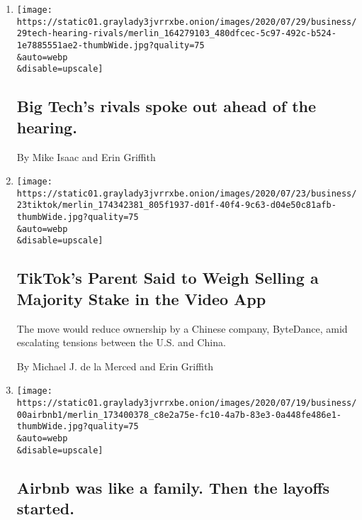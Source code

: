 \begin{enumerate}
\def\labelenumi{\arabic{enumi}.}
\item
  \href{/live/2020/07/29/technology/tech-ceos-hearing-testimony/big-techs-rivals-spoke-out-ahead-of-the-hearing}{}

  \texttt{[image: https://static01.graylady3jvrrxbe.onion/images/2020/07/29/business/29tech-hearing-rivals/merlin\_164279103\_480dfcec-5c97-492c-b524-1e7885551ae2-thumbWide.jpg?quality=75\\\&auto=webp\\\&disable=upscale]}

  \hypertarget{big-techs-rivals-spoke-out-ahead-of-the-hearing}{%
  \subsection{Big Tech's rivals spoke out ahead of the
  hearing.}\label{big-techs-rivals-spoke-out-ahead-of-the-hearing}}

  By Mike Isaac and Erin Griffith
\item
  \href{/2020/07/23/business/dealbook/tiktok-bytedance-investors-trump.html}{}

  \texttt{[image: https://static01.graylady3jvrrxbe.onion/images/2020/07/23/business/23tiktok/merlin\_174342381\_805f1937-d01f-40f4-9c63-d04e50c81afb-thumbWide.jpg?quality=75\\\&auto=webp\\\&disable=upscale]}

  \hypertarget{tiktoks-parent-said-to-weigh-selling-a-majority-stake-in-the-video-app}{%
  \subsection{TikTok's Parent Said to Weigh Selling a Majority Stake in
  the Video
  App}\label{tiktoks-parent-said-to-weigh-selling-a-majority-stake-in-the-video-app}}

  The move would reduce ownership by a Chinese company, ByteDance, amid
  escalating tensions between the U.S. and China.

  By Michael J. de la Merced and Erin Griffith
\item
  \href{/live/2020/07/17/business/stock-market-today-coronavirus/airbnb-was-like-a-family-then-the-layoffs-started}{}

  \texttt{[image: https://static01.graylady3jvrrxbe.onion/images/2020/07/19/business/00airbnb1/merlin\_173400378\_c8e2a75e-fc10-4a7b-83e3-0a448fe486e1-thumbWide.jpg?quality=75\\\&auto=webp\\\&disable=upscale]}

  \hypertarget{airbnb-was-like-a-family-then-the-layoffs-started}{%
  \subsection{Airbnb was like a family. Then the layoffs
  started.}\label{airbnb-was-like-a-family-then-the-layoffs-started}}


\end{enumerate}
